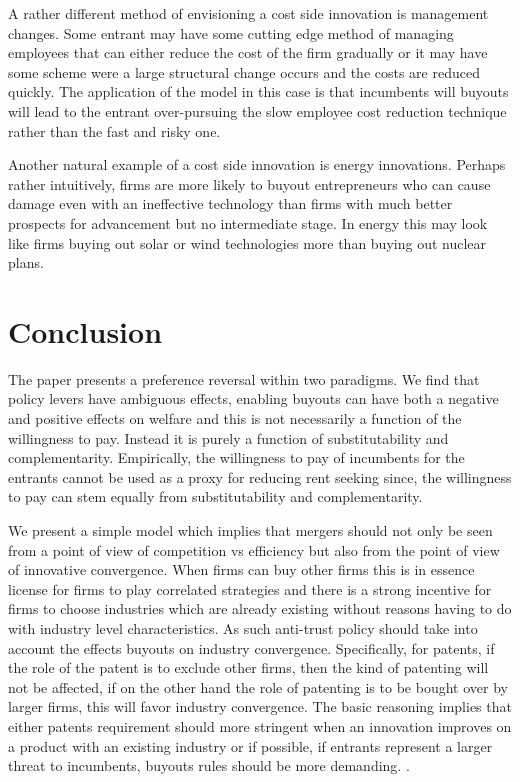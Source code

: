 A rather different method of envisioning a cost side innovation is management changes. Some entrant may have some cutting edge method of managing employees that can either reduce the cost of the firm gradually or it may have some scheme were a large structural change occurs and the costs are reduced quickly. The application of the model in this case is that incumbents will buyouts will lead to the entrant over-pursuing the slow employee cost reduction technique rather than the fast and risky one.  

Another natural example of a cost side innovation is energy innovations. Perhaps rather intuitively, firms are more likely to buyout entrepreneurs who can cause damage even with an ineffective technology than firms with much better prospects for advancement but no intermediate stage. In energy this may look like firms buying out solar or wind technologies more than buying out nuclear plans.   



\section{Conclusion}


The paper presents a preference reversal within two paradigms. We find that policy levers have ambiguous effects, enabling buyouts can have both a negative and positive effects on welfare and this is not necessarily a function of the willingness to pay. Instead it is purely a function of substitutability and complementarity. Empirically, the willingness to pay of incumbents for the entrants cannot be used as a proxy for reducing rent seeking since, the willingness to pay can stem equally from substitutability and complementarity. 

We present a simple model which implies that mergers should not only be seen from a point of view of competition vs efficiency but also from the point of view of innovative convergence. When firms can buy other firms this is in essence license for firms to play correlated strategies and there is a strong incentive for firms to choose industries which are already existing without reasons having to do with industry level characteristics. As such anti-trust policy should take into account the effects buyouts on industry convergence. Specifically, for patents, if the role of the patent is to exclude other firms, then the kind of patenting will not be affected, if on the other hand the role of patenting is to be bought over by larger firms, this will favor industry convergence. The basic reasoning implies that either patents requirement should more stringent when an innovation improves on a product with an existing industry or if possible, if entrants represent a larger threat to incumbents, buyouts rules should be more demanding. . 

